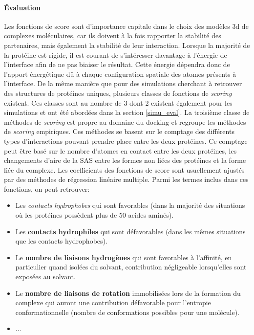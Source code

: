 \paragraph{Évaluation} \label{docking_eval}

Les fonctions de score sont d'importance capitale dans le choix des modèles 3d de complexes moléculaires, car ils doivent à la fois rapporter la stabilité des partenaires, mais également la stabilité de leur interaction. Lorsque la majorité de la protéine est rigide, il est courant de s'intéresser davantage à l'énergie de l'interface afin de ne pas biaiser le résultat. Cette énergie dépendra donc de l'apport énergétique dû à chaque configuration spatiale des atomes présents à l'interface. De la même manière que pour des simulations cherchant à retrouver des structures de protéines uniques, plusieurs classes de fonctions de \textit{scoring} existent. Ces classes sont au nombre de 3 dont 2 existent également pour les simulations et ont été abordées dans la section \ref{simu_eval}. La troisième classe de méthodes de \textit{scoring} est propre au domaine du docking et regroupe les méthodes de \textit{scoring} empiriques.
Ces méthodes se basent sur le comptage des différents types d'interactions pouvant prendre place entre les deux protéines. Ce comptage peut être basé sur le nombre d'atomes en contact entre les deux protéines, les changements d'aire de la SAS entre les formes non liées des protéines et la forme liée du complexe. Les coefficients des fonctions de score sont usuellement ajustés par des méthodes de régression linéaire multiple. Parmi les termes inclus dans ces fonctions, on peut retrouver:

\begin{itemize}
	\item Les \textit{contacts hydrophobes} qui sont favorables (dans la majorité des situations où les protéines possèdent plus de 50 acides aminés).
	\item Les \textbf{contacts hydrophiles} qui sont défavorables (dans les mêmes situations que les contacts hydrophobes).
	\item Le \textbf{nombre de liaisons hydrogènes} qui sont favorables à l'affinité, en particulier quand isolées du solvant, contribution négligeable lorsqu'elles sont exposées au solvant.
	\item Le \textbf{nombre de liaisons de rotation} immobilisées lors de la formation du complexe qui auront une contribution défavorable pour l'entropie conformationnelle (nombre de conformations possibles pour une molécule).
	\item ...
\end{itemize}

